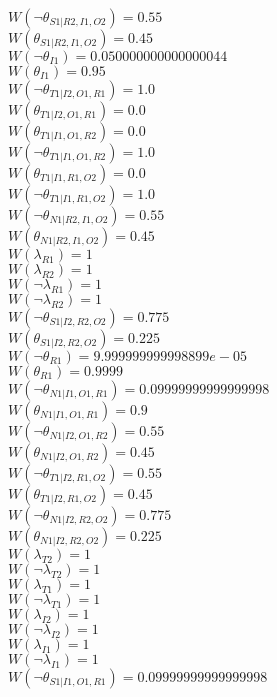 $W(\neg\theta_{S1|R2,I1,O2})=0.55$\\
$W(\theta_{S1|R2,I1,O2})=0.45$\\
$W(\neg\theta_{I1})=0.050000000000000044$\\
$W(\theta_{I1})=0.95$\\
$W(\neg\theta_{T1|I2,O1,R1})=1.0$\\
$W(\theta_{T1|I2,O1,R1})=0.0$\\
$W(\theta_{T1|I1,O1,R2})=0.0$\\
$W(\neg\theta_{T1|I1,O1,R2})=1.0$\\
$W(\theta_{T1|I1,R1,O2})=0.0$\\
$W(\neg\theta_{T1|I1,R1,O2})=1.0$\\
$W(\neg\theta_{N1|R2,I1,O2})=0.55$\\
$W(\theta_{N1|R2,I1,O2})=0.45$\\
$W(\lambda_{R1})=1$\\
$W(\lambda_{R2})=1$\\
$W(\neg\lambda_{R1})=1$\\
$W(\neg\lambda_{R2})=1$\\
$W(\neg\theta_{S1|I2,R2,O2})=0.775$\\
$W(\theta_{S1|I2,R2,O2})=0.225$\\
$W(\neg\theta_{R1})=9.999999999998899e-05$\\
$W(\theta_{R1})=0.9999$\\
$W(\neg\theta_{N1|I1,O1,R1})=0.09999999999999998$\\
$W(\theta_{N1|I1,O1,R1})=0.9$\\
$W(\neg\theta_{N1|I2,O1,R2})=0.55$\\
$W(\theta_{N1|I2,O1,R2})=0.45$\\
$W(\neg\theta_{T1|I2,R1,O2})=0.55$\\
$W(\theta_{T1|I2,R1,O2})=0.45$\\
$W(\neg\theta_{N1|I2,R2,O2})=0.775$\\
$W(\theta_{N1|I2,R2,O2})=0.225$\\
$W(\lambda_{T2})=1$\\
$W(\neg\lambda_{T2})=1$\\
$W(\lambda_{T1})=1$\\
$W(\neg\lambda_{T1})=1$\\
$W(\lambda_{I2})=1$\\
$W(\neg\lambda_{I2})=1$\\
$W(\lambda_{I1})=1$\\
$W(\neg\lambda_{I1})=1$\\
$W(\neg\theta_{S1|I1,O1,R1})=0.09999999999999998$\\

